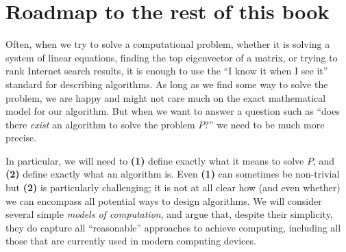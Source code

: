 
\section{Roadmap to the rest of this book}\label{roadmapsec}

Often, when we try to solve a computational problem, whether it is
solving a system of linear equations, finding the top eigenvector of a
matrix, or trying to rank Internet search results, it is enough to use
the ``I know it when I see it'' standard for describing algorithms. As
long as we find some way to solve the problem, we are happy and might
not care much on the exact mathematical model for our algorithm. But
when we want to answer a question such as ``does there \emph{exist} an
algorithm to solve the problem \(P\)?'' we need to be much more precise.

In particular, we will need to \textbf{(1)} define exactly what it means
to solve \(P\), and \textbf{(2)} define exactly what an algorithm is.
Even \textbf{(1)} can sometimes be non-trivial but \textbf{(2)} is
particularly challenging; it is not at all clear how (and even whether)
we can encompass all potential ways to design algorithms. We will
consider several simple \emph{models of computation}, and argue that,
despite their simplicity, they do capture all ``reasonable'' approaches
to achieve computing, including all those that are currently used in
modern computing devices.


